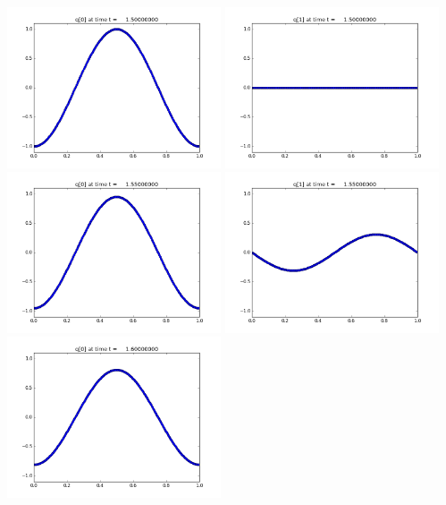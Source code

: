 \documentclass[11pt]{article}
\begin{document}
\vskip 10pt 
\includegraphics[width=0.475\textwidth]{frame0030fig0.png}
\includegraphics[width=0.475\textwidth]{frame0030fig1.png}
\vskip 10pt 
\includegraphics[width=0.475\textwidth]{frame0031fig0.png}
\includegraphics[width=0.475\textwidth]{frame0031fig1.png}
\vskip 10pt 
\includegraphics[width=0.475\textwidth]{frame0032fig0.png}
\end{document}
